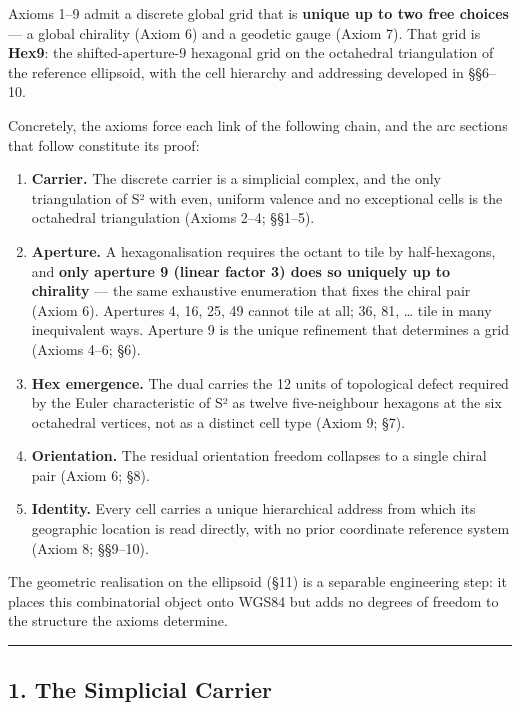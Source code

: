 \documentclass[
  11pt,
  a4paper,
]{article}
\providecommand{\tightlist}{%
  \setlength{\itemsep}{0pt}\setlength{\parskip}{0pt}}
\begin{document}
Axioms 1--9 admit a discrete global grid that is \textbf{unique up to
two free choices} --- a global chirality (Axiom 6) and a geodetic gauge
(Axiom 7). That grid is \textbf{Hex9}: the shifted-aperture-9 hexagonal
grid on the octahedral triangulation of the reference ellipsoid, with
the cell hierarchy and addressing developed in §§6--10.

Concretely, the axioms force each link of the following chain, and the
arc sections that follow constitute its proof:

\begin{enumerate}
\def\labelenumi{\arabic{enumi}.}
\tightlist
\item
  \textbf{Carrier.} The discrete carrier is a simplicial complex, and
  the only triangulation of S² with even, uniform valence and no
  exceptional cells is the octahedral triangulation (Axioms 2--4;
  §§1--5).
\item
  \textbf{Aperture.} A hexagonalisation requires the octant to tile by
  half-hexagons, and \textbf{only aperture 9 (linear factor 3) does so
  uniquely up to chirality} --- the same exhaustive enumeration that
  fixes the chiral pair (Axiom 6). Apertures 4, 16, 25, 49 cannot tile
  at all; 36, 81, \ldots{} tile in many inequivalent ways. Aperture 9 is
  the unique refinement that determines a grid (Axioms 4--6; §6).
\item
  \textbf{Hex emergence.} The dual carries the 12 units of topological
  defect required by the Euler characteristic of S² as twelve
  five-neighbour hexagons at the six octahedral vertices, not as a
  distinct cell type (Axiom 9; §7).
\item
  \textbf{Orientation.} The residual orientation freedom collapses to a
  single chiral pair (Axiom 6; §8).
\item
  \textbf{Identity.} Every cell carries a unique hierarchical address
  from which its geographic location is read directly, with no prior
  coordinate reference system (Axiom 8; §§9--10).
\end{enumerate}

The geometric realisation on the ellipsoid (§11) is a separable
engineering step: it places this combinatorial object onto WGS84 but
adds no degrees of freedom to the structure the axioms determine.

\begin{center}\rule{0.5\linewidth}{0.5pt}\end{center}

\subsection{1. The Simplicial Carrier}\label{the-simplicial-carrier}
\end{document}
